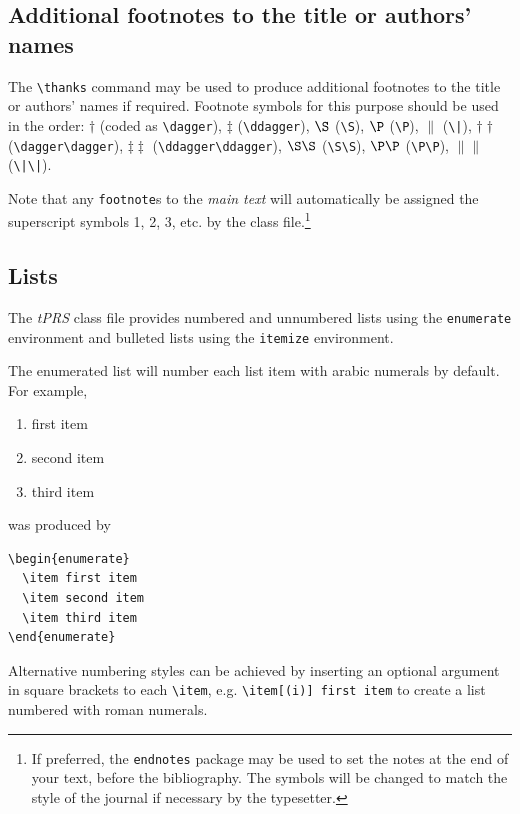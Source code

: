 \documentclass{tPRS2e}
\begin{document}
\subsection{Additional footnotes to the title or authors' names}

The \verb"\thanks" command may be used to produce additional footnotes to the title or authors' names if required.
Footnote symbols for this purpose should be used in the order:
$\dagger$ (coded as \verb"\dagger"), $\ddagger$ (\verb"\ddagger"), $\S$ (\verb"\S"), $\P$ (\verb"\P"), $\|$ (\verb"\|"),
$\dagger\dagger$ (\verb"\dagger\dagger"), $\ddagger\ddagger$ (\verb"\ddagger\ddagger"), $\S\S$ (\verb"\S\S"),\break
$\P\P$ (\verb"\P\P"), $\|\|$ (\verb"\|\|").

Note that any \verb"footnote"s to the \emph{main text} will automatically be assigned the superscript
 symbols 1, 2, 3, etc. by the class file.\footnote{If preferred, the \texttt{endnotes} package
 may be used to set the notes at the end of your text, before the bibliography.
 The symbols will be changed to match the style of the journal if necessary by the typesetter.}


\subsection{Lists}

The \textit{tPRS} class file provides numbered and unnumbered lists using the \texttt{enumerate} environment and bulleted
lists using the \texttt{itemize} environment.

The enumerated list will number each list item with arabic numerals by default. For example,
\begin{enumerate}
  \item first item
  \item second item
  \item third item
\end{enumerate}
was produced by
\begin{verbatim}
\begin{enumerate}
  \item first item
  \item second item
  \item third item
\end{enumerate}
\end{verbatim}
Alternative numbering styles can be achieved by inserting an optional argument in square brackets to each \verb"\item", e.g. \verb"\item[(i)] first item" to create a list numbered with roman numerals.
\end{document}
